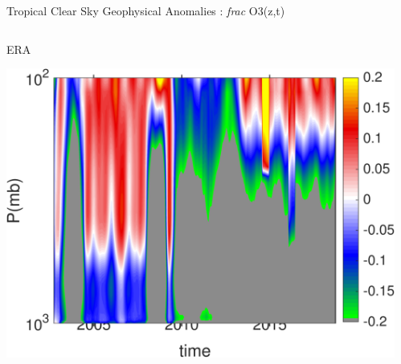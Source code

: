 \documentclass[10pt,t]{beamer}
\begin{document}

\begin{frame}{Tropical Clear Sky Geophysical Anomalies : \textit{frac} O3(z,t)}
\vspace{-0.35in}

\begin{columns}
\begin{column}{0.45\columnwidth}
\begin{block}{\footnotesize ERA}
\vspace{-0.1in}
\begin{center}
\includegraphics[width=\linewidth]{Figs/ClearAnom/era_clr_o3_anom_200209_201808.png}
\end{center}
\end{block}
\end{column}

\begin{column}{0.45\columnwidth}
\end{column}
\end{columns}

\vspace{-0.25in}


\end{frame}
\end{document}
